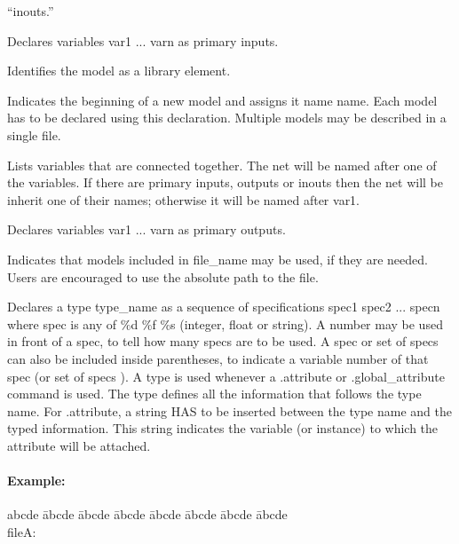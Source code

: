 {\begin{pespace}
\begin{description}
          ``inouts.''
\item     [.inputs var1 var2 ... varn ;]
          Declares variables var1 ... varn as primary inputs.
\item     [.library ;]
          Identifies the model as a library element.
\item     [.model name ;]
          Indicates the beginning of a new model and assigns it
          name name. Each model has to be declared using this
          declaration.  Multiple models may be described in a
          single file.
\item     [.net var1 var2 ... varn ;]
          Lists variables that are connected together.  The net
          will be named after one of the variables.  If there are
          primary inputs, outputs or inouts then the net will be
          inherit one of their names; otherwise it will be named
          after var1.
\item     [.outputs var1 var2 ... varn ;]
          Declares variables var1 ... varn as primary outputs.
\item     [.search file\_name ;]
          Indicates that models included in file\_name may be
          used, if they are needed.  Users are encouraged to use
          the absolute path to the file.
\item     [.type type\_name spec1 spec2 ... specn ;]
          Declares a type type\_name as a sequence of specifications
	  spec1 spec2 ... specn where spec is any of \%d \%f
          \%s (integer, float or string). A number may be used in
          front of a spec, to tell how many specs are to be used.
          A spec or set of specs can also be included inside
          parentheses, to indicate a variable number of that spec
          (or set of specs ).  A type is used whenever a .attribute
	  or .global\_attribute command is used. The type
          defines all the information that follows the type name.
          For .attribute, a string HAS to be inserted between the
          type name and the typed information. This string
          indicates the variable (or instance) to which the
          attribute will be attached.
\end{description}

\paragraph{Example:}

\begin{tabbing}
abcde \= abcde \= abcde \= abcde \= abcde \= abcde \= abcde \= abcde \kill
 \+ \\
     fileA: \\


\end{tabbing}
\end{pespace}}
